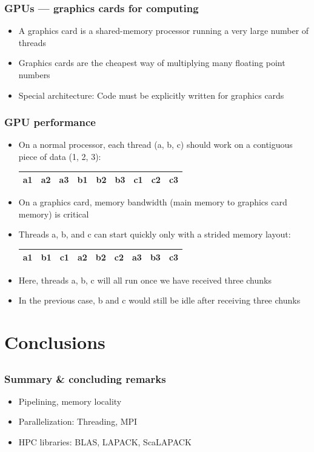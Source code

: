 \documentclass[usenames,dvipsnames,mathserif,compress]{beamer}
\begin{document}
\begin{frame}
  \frametitle{GPUs --- graphics cards for computing}
  \begin{itemize}
  \item A graphics card is a shared-memory processor running a very large number of threads
  \item Graphics cards are the cheapest way of multiplying many floating point numbers
  \item Special architecture: Code must be explicitly written for graphics cards
    \end{itemize}
\end{frame}

\begin{frame}
  \frametitle{GPU performance}
  \begin{itemize}
  \item On a normal processor, each thread (a, b, c) should work on a contiguous piece of data (1, 2, 3):
    \begin{table}
    \begin{tabular}{|ccc|ccc|ccc|}\hline
      a1 &a2 &a3 &b1 &b2 &b3 &c1 &c2 &c3\\\hline
    \end{tabular}
    \end{table}
  \item On a graphics card, memory bandwidth (main memory to graphics card memory) is critical
  \item Threads a, b, and c can start quickly only with a \alert{strided} memory layout:
    \begin{table}
    \begin{tabular}{|c|c|c|c|c|c|c|c|c|}\hline
      a1 &b1 &c1 &a2 &b2 &c2 &a3 &b3 &c3\\\hline
    \end{tabular}
    \end{table}
  \item Here, threads a, b, c will all run once we have received three chunks
  \item In the previous case, b and c would still be idle after receiving three chunks
  \end{itemize}
\end{frame}

\section*{Conclusions}
\subsection*{}
\begin{frame}
  \frametitle{Summary \& concluding remarks}
  \begin{itemize}
  \item Pipelining, memory locality
  \item Parallelization: Threading, MPI
  \item HPC libraries: BLAS, LAPACK, ScaLAPACK
  \end{itemize}
\end{frame}
\end{document}
